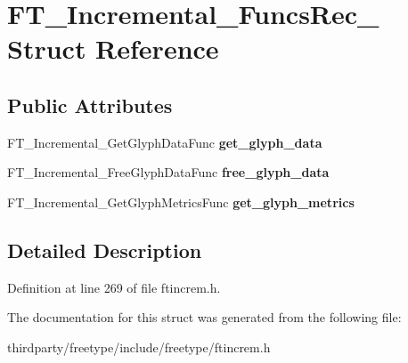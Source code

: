 \hypertarget{struct_f_t___incremental___funcs_rec__}{}\section{F\+T\+\_\+\+Incremental\+\_\+\+Funcs\+Rec\+\_\+ Struct Reference}
\label{struct_f_t___incremental___funcs_rec__}
\subsection*{Public Attributes}
\begin{DoxyCompactItemize}
\item 
\mbox{\label{struct_f_t___incremental___funcs_rec___ac276b7ff9624b8d8bf144ab8d00538b4}} 
F\+T\+\_\+\+Incremental\+\_\+\+Get\+Glyph\+Data\+Func {\bfseries get\+\_\+glyph\+\_\+data}
\item 
\mbox{\label{struct_f_t___incremental___funcs_rec___a9201afcfda8c15be839aee04306dff0a}} 
F\+T\+\_\+\+Incremental\+\_\+\+Free\+Glyph\+Data\+Func {\bfseries free\+\_\+glyph\+\_\+data}
\item 
\mbox{\label{struct_f_t___incremental___funcs_rec___ac7d95e85357ab9d1893660b0628c1908}} 
F\+T\+\_\+\+Incremental\+\_\+\+Get\+Glyph\+Metrics\+Func {\bfseries get\+\_\+glyph\+\_\+metrics}
\end{DoxyCompactItemize}


\subsection{Detailed Description}


Definition at line 269 of file ftincrem.\+h.



The documentation for this struct was generated from the following file\+:\begin{DoxyCompactItemize}
\item 
thirdparty/freetype/include/freetype/ftincrem.\+h\end{DoxyCompactItemize}
